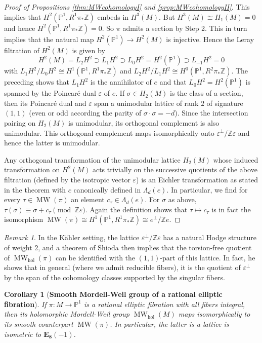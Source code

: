\documentclass[10pt,letterpaper]{amsart}
\numberwithin{equation}{section}
\def\PP{{\mathbb P}}
\def\ZZ{{\mathbb Z}}
\def\hol{\mathrm{hol}}
\newcommand{\eps}{\varepsilon}
\newcommand\MW{\operatorname{MW}}
\newtheorem{corollary}[theorem]{Corollary}
\theoremstyle{remark}
\newtheorem{remark}[theorem]{Remark}
\begin{document}
\begin{proof}[Proof of  Propositions  \ref{thm:MWcohomologyI} and \ref{prop:MWcohomologyII}]
This implies that $H^2(\PP^1, R^1\pi_*\ZZ)$ embeds in $H^3(M)$. But $H^3(M)\cong H_1(M)=0$ and hence $H^2(\PP^1, R^1\pi_*\ZZ)=0$.
So $\pi$ admits a section by Step 2. This in turn implies that the natural map $H^2(\PP^1)\to H^2(M)$ is injective.
Hence the Leray filtration  of  $H^2(M)$ is given by 
\[
H^2(M)=L_2H^2\supset L_1H^2\supset L_0H^2=H^2(\PP^1)\supset L_{-1}H^2=0
\]
with $L_1H^2/L_0H^2\cong H^1(\PP^1, R^1\pi_*\ZZ)$ and $L_2H^2/L_1H^2\cong  H^0(\PP^1, R^2\pi_*\ZZ)$. 
The preceding shows that $L_1H^2$ is the annihilator of $e$ and that $L_0H^2=H^2(\PP^1)$ is spanned by the Poincar\'e dual $\eps $ of $e$. If $\sigma\in H_2(M)$ is the class of  a section, then its Poincar\'e dual and $\eps $ span a unimodular lattice of rank $2$  of signature  $(1,1)$ (even or odd according the parity of $\sigma\cdot\sigma=-d$).  
Since the intersection pairing on $H_2(M)$ is unimodular, its orthogonal complement is also unimodular. This 
orthogonal complement maps isomorphically onto $\eps ^\perp/\ZZ \eps $ and hence the latter  is unimodular. 

Any orthogonal transformation of the unimodular lattice  $H_2(M)$ whose induced transformation on $H^2(M)$ acts trivially on the successive quotients of the above filtration (defined by the isotropic vector $\eps$) is an Eichler transformation as stated in the theorem  with $c$ canonically defined in $\Lambda_d(e)$. In particular, we find for every $\tau\in \MW(\pi)$ an element $c_\tau\in \Lambda_d(e)$. For $\sigma$  as above,  $\tau (\sigma)\equiv \sigma+c_\tau\pmod{\ZZ \eps }$.
Again the  definition shows that $\tau\mapsto c_\tau$ is in fact the isomorphism $\MW(\pi)\cong H^1(\PP^1, R^1\pi_*\ZZ)\cong e^\perp/\ZZ e$. 
\end{proof}



\begin{remark}\label{rem:}
In the K\"ahler setting, the lattice $\eps ^\perp/\ZZ \eps $ has a natural Hodge structure of weight $2$, and a theorem of Shioda \cite{shioda} then implies that the torsion-free quotient of $\MW_\hol(\pi)$ 
can be identified with the $(1,1)$-part of this lattice. In fact, he shows  that in general (where we admit reducible fibers), it is the quotient of $\eps ^\perp$ by  the span of the cohomology classes supported by the singular fibers.
\end{remark}

\begin{corollary}[{\bf Smooth Mordell-Weil group of a rational elliptic fibration}]
\label{cor:}
If $\pi :M\to \PP^1$ is a rational elliptic fibration  with all fibers integral, then 
its  holomorphic Mordell-Weil group $\MW_\hol(M)$ maps isomorphically to its smooth counterpart $\MW(\pi)$. In particular, the latter is a lattice is isometric to $\mathbf{E_8}(-1)$.
\end{corollary}
\end{document}
